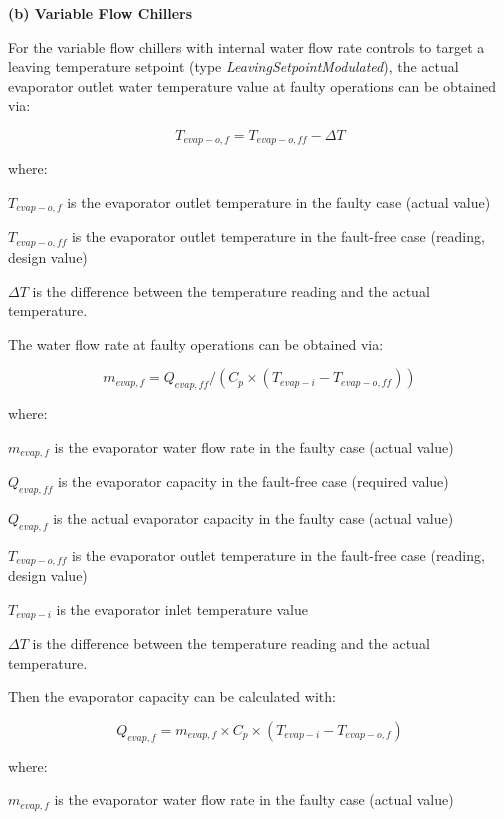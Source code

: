 \textbf{(b) Variable Flow Chillers}

For the variable flow chillers with internal water flow rate controls to target a leaving temperature setpoint (type \emph{LeavingSetpointModulated}), the actual evaporator outlet water temperature value at faulty operations can be obtained via:

\begin{equation}
T_{evap-o,f} = T_{evap-o,ff} - \Delta T
\end{equation}

where:

\(T_{evap-o,f}\) is the evaporator outlet temperature in the faulty case (actual value)

\(T_{evap-o,ff}\) is the evaporator outlet temperature in the fault-free case (reading, design value)

\(\Delta T\) is the difference between the temperature reading and the actual temperature.

The water flow rate at faulty operations can be obtained via:

\begin{equation}
m_{evap,f} = Q_{evap,ff} / ( C_p \times (T_{evap-i} - T_{evap-o,ff} ) )
\end{equation}

where:

\(m_{evap,f}\) is the evaporator water flow rate in the faulty case (actual value)

\(Q_{evap,ff}\) is the evaporator capacity in the fault-free case (required value)

\(Q_{evap,f}\) is the actual evaporator capacity in the faulty case (actual value)

\(T_{evap-o,ff}\) is the evaporator outlet temperature in the fault-free case (reading, design value)

\(T_{evap-i}\) is the evaporator inlet temperature value 

\(\Delta T\) is the difference between the temperature reading and the actual temperature.

Then the evaporator capacity can be calculated with:

\begin{equation}
Q_{evap,f} = m_{evap,f} \times C_p \times (T_{evap-i} - T_{evap-o,f} )
\end{equation}

where:

\(m_{evap,f}\) is the evaporator water flow rate in the faulty case (actual value)

